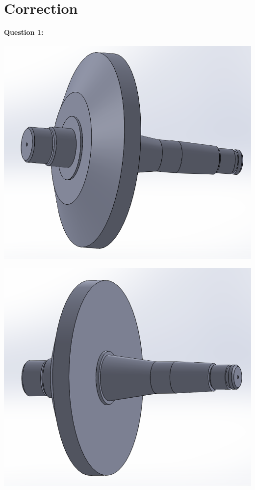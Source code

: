 

\ifdef{\public}{}{}

\newpage

\pagestyle{correction}

\section{Correction}

\paragraph{Question 1:}



\includegraphics[width=0.9\linewidth]{img/Piece5/Piece5_1.png}

\includegraphics[width=0.9\linewidth]{img/Piece5/Piece5_2.png}


